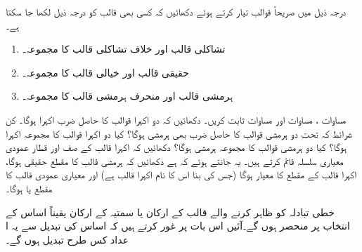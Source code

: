 درجہ ذیل میں صریحاً قوالب تیار کرتے ہوئے دکھائیں کہ کسی بھی قالب  کو درجہ ذیل لکھا جا سکتا ہے۔
\begin{enumerate}
\item
 تشاکلی قالب  اور خلاف تشاکلی قالب  کا مجموعہ۔
\item
 حقیقی قالب  اور خیالی قالب  کا مجموعہ۔
\item
ہرمشی قالب  اور منحرف ہرمشی قالب  کا مجموعہ۔
\end{enumerate}
مساوات ، مساوات   اور مساوات    ثابت کریں۔ دکھائیں کہ دو اکہرا قوالب کا حاصل ضرب اکہرا ہوگا۔ کن شرائط کہ تحت دو ہرمشی قوالب کا حاصل ضرب بھی  ہرمشی ہوگا؟ کیا دو اکہرا قوالب کا مجموعہ اکہرا ہوگا؟ کیا دو ہرمشی قوالب کا مجموعہ ہرمشی ہوگا؟
دکھائیں کہ اکہرا قالب کے صف اور قطار عمودی معیاری سلسلہ قائم کرتے ہیں۔
یہ  جانتے  ہوئے کہ ہے  دکھائیں کہ ہرمشی قالب کا مقطع حقیقی ہوگا،  اکہرا قالب کے مقطع کا معیار  ہوگا  (جس کی بنا اس کا نام اکہرا قالب ہے)  اور معیاری عمودی قالب کا مقطع   یا  ہوگا۔

 خطی تبادلہ کو ظاہر کرنے والے قالب کے ارکان یا  سمتیہ کے ارکان  یقیناً  اساس کے  انتخاب پر منحصر ہوں گے۔آئیں اس بات پر غور کرتے ہیں کہ    اساس کی  تبدیل  سے یہ   ا عداد کس طرح   تبدیل  ہوں گے۔
 

